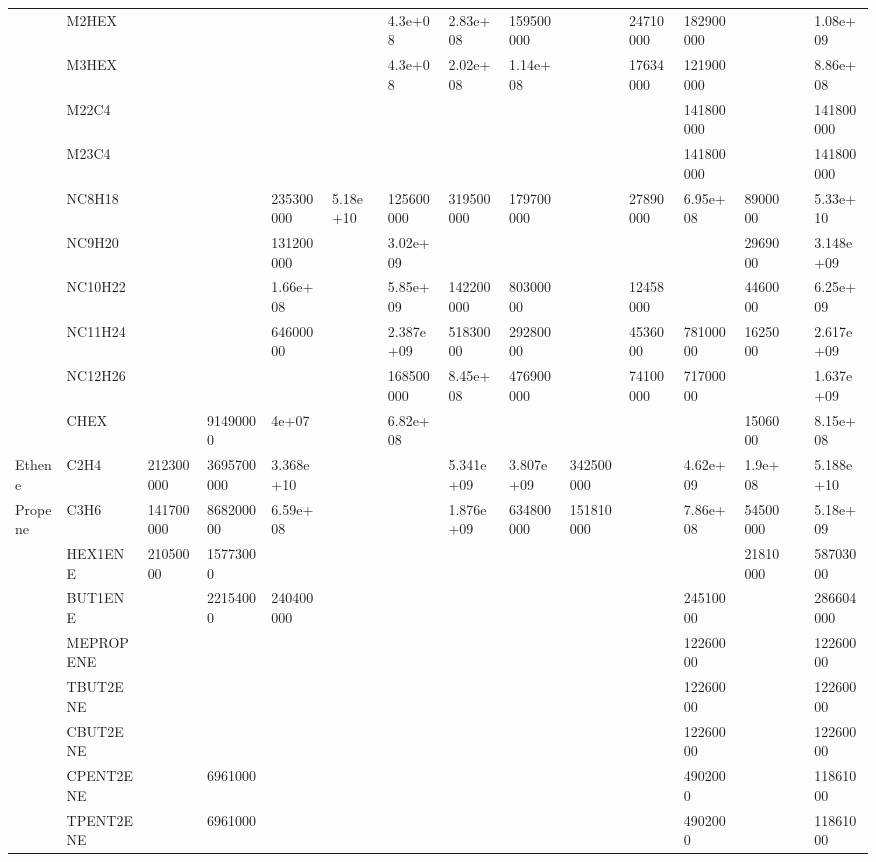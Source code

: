 \begin{longtable}{lllllllllllllll}
	 & M2HEX &  &  &  &  & 4.3e+08 & 2.83e+08 & 159500000 &  & 24710000 & 182900000 &  &  & 1.08e+09 \\
	 & M3HEX &  &  &  &  & 4.3e+08 & 2.02e+08 & 1.14e+08 &  & 17634000 & 121900000 &  &  & 8.86e+08 \\
	 & M22C4 &  &  &  &  &  &  &  &  &  & 141800000 &  &  & 141800000 \\
	 & M23C4 &  &  &  &  &  &  &  &  &  & 141800000 &  &  & 141800000 \\
	 & NC8H18 &  &  & 235300000 & 5.18e+10 & 125600000 & 319500000 & 179700000 &  & 27890000 & 6.95e+08 & 8900000 &  & 5.33e+10 \\
	 & NC9H20 &  &  & 131200000 &  & 3.02e+09 &  &  &  &  &  & 2969000 &  & 3.148e+09 \\
	 & NC10H22 &  &  & 1.66e+08 &  & 5.85e+09 & 142200000 & 80300000 &  & 12458000 &  & 4460000 &  & 6.25e+09 \\
	 & NC11H24 &  &  & 64600000 &  & 2.387e+09 & 51830000 & 29280000 &  & 4536000 & 78100000 & 1625000 &  & 2.617e+09 \\
	 & NC12H26 &  &  &  &  & 168500000 & 8.45e+08 & 476900000 &  & 74100000 & 71700000 &  &  & 1.637e+09 \\
	 & CHEX &  & 91490000 & 4e+07 &  & 6.82e+08 &  &  &  &  &  & 1506000 &  & 8.15e+08 \\
	\hline Ethene & C2H4 & 212300000 & 3695700000 & 3.368e+10 &  &  & 5.341e+09 & 3.807e+09 & 342500000 &  & 4.62e+09 & 1.9e+08 &  & 5.188e+10 \\ \hline
	Propene & C3H6 & 141700000 & 868200000 & 6.59e+08 &  &  & 1.876e+09 & 634800000 & 151810000 &  & 7.86e+08 & 54500000 &  & 5.18e+09 \\
	\hline \parbox[t]{2mm}{} & HEX1ENE & 21050000 & 15773000 &  &  &  &  &  &  &  &  & 21810000 &  & 58703000 \\
	 & BUT1ENE &  & 22154000 & 240400000 &  &  &  &  &  &  & 24510000 &  &  & 286604000 \\
	 & MEPROPENE &  &  &  &  &  &  &  &  &  & 12260000 &  &  & 12260000 \\
	 & TBUT2ENE &  &  &  &  &  &  &  &  &  & 12260000 &  &  & 12260000 \\
	 & CBUT2ENE &  &  &  &  &  &  &  &  &  & 12260000 &  &  & 12260000 \\
	 & CPENT2ENE &  & 6961000 &  &  &  &  &  &  &  & 4902000 &  &  & 11861000 \\
	 & TPENT2ENE &  & 6961000 &  &  &  &  &  &  &  & 4902000 &  &  & 11861000 \\

\end{longtable}
